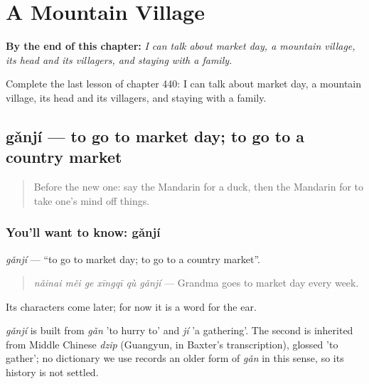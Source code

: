 
\chapter{A Mountain Village}
\label{ch:zh-a-mountain-village}

\begin{chapteropening}
\textbf{By the end of this chapter:} \emph{I can talk about market day, a mountain village, its head and its villagers, and staying with a family.}

Complete the last lesson of chapter 440: I can talk about market day, a mountain village, its head and its villagers, and staying with a family.
\end{chapteropening}

\section[gǎnjí]{gǎnjí — to go to market day; to go to a country market}

\label{lesson:ZH-C440-ganji}



\begin{quote}
Before the new one: say the Mandarin for a duck, then the Mandarin for to take one's mind off things.
\end{quote}

\subsection*{You'll want to know: gǎnjí}
\emph{gǎnjí} — \textquotedblleft{}to go to market day; to go to a country market\textquotedblright{}.

\begin{quote}
\emph{nǎinai měi ge xīngqī qù gǎnjí} — Grandma goes to market day every week.
\end{quote}

Its characters come later; for now it is a word for the ear.

\begin{cousinweb}
\emph{gǎnjí} is built from \emph{gǎn} 'to hurry to' and \emph{jí} 'a gathering'. The second is inherited from Middle Chinese \emph{dzip} (Guangyun, in Baxter's transcription), glossed 'to gather'; no dictionary we use records an older form of \emph{gǎn} in this sense, so its history is not settled.
\end{cousinweb}

